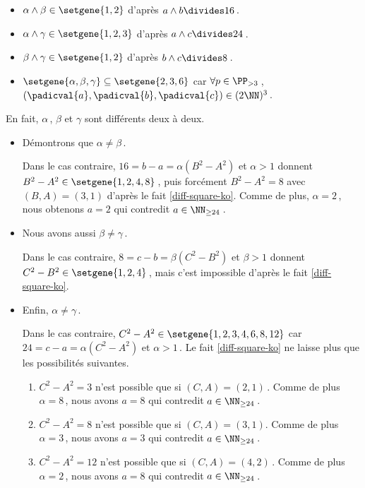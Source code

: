 \begin{itemize}
	\item $\alpha \wedge \beta \in \setgene{1, 2}$
	d'après $a \wedge b \divides 16$\,.

	\item $\alpha \wedge \gamma \in \setgene{1, 2, 3}$
	d'après $a \wedge c \divides 24$\,.

	\item $\beta \wedge \gamma \in \setgene{1, 2}$
	d'après $b \wedge c \divides 8$\,.

	\item $\setgene{\alpha, \beta, \gamma} \subseteq \setgene{2, 3, 6}$
	car $\forall p \in \PP_{>3}$\,, $(\padicval{a}, \padicval{b}, \padicval{c}) \in ( 2 \NN )^3$\,. 
\end{itemize}
		
\medskip

En fait, $\alpha$\,, $\beta$ et $\gamma$ sont différents deux à deux.
	
\begin{itemize}	
	\item Démontrons que $\alpha \neq \beta$\,. 
		
	\noindent
	Dans le cas contraire, $16 = b - a = \alpha(B^2 - A^2)$ et $\alpha > 1$ donnent $B^2 - A^2 \in \setgene{1, 2, 4, 8}$\,, puis forcément $B^2 - A^2 = 8$ avec $(B, A) = (3, 1)$ d'après le fait \ref{diff-square-ko}.
	Comme de plus, $\alpha = 2$\,, nous obtenons $a = 2$ qui contredit $a \in \NN_{\geq 24}$\,.		

	\item Nous avons aussi $\beta \neq \gamma$\,. 
		
	\noindent
	Dans le cas contraire, $8 = c - b = \beta(C^2 - B^2)$ et $\beta > 1$ donnent $C^2 - B^2 \in \setgene{1, 2, 4}$\,, mais c'est impossible d'après le fait \ref{diff-square-ko}.
		

	\item Enfin, $\alpha \neq \gamma$\,. 
		
	\noindent
	Dans le cas contraire,
	$C^2 - A^2 \in \setgene{1, 2, 3, 4, 6, 8, 12}$
	car 
	$24 = c - a = \alpha(C^2 - A^2)$ et $\alpha > 1$\,.
	Le fait \ref{diff-square-ko} ne laisse plus que les possibilités suivantes.
	\begin{enumerate}
		\item $C^2 - A^2 = 3$ n'est possible que si $(C, A) = (2, 1)$\,.
		Comme de plus $\alpha = 8$\,, nous avons $a = 8$ qui contredit $a \in \NN_{\geq 24}$\,.
			
			
		\item $C^2 - A^2 = 8$ n'est possible que si $(C, A) = (3, 1)$.
		Comme de plus $\alpha = 3$\,, nous avons $a = 3$ qui contredit $a \in \NN_{\geq 24}$\,.
			
		
		\item $C^2 - A^2 = 12$ n'est possible que si $(C, A) = (4, 2)$\,.
		Comme de plus $\alpha = 2$\,, nous avons $a = 8$ qui contredit $a \in \NN_{\geq 24}$\,.
	\end{enumerate}
\end{itemize}


